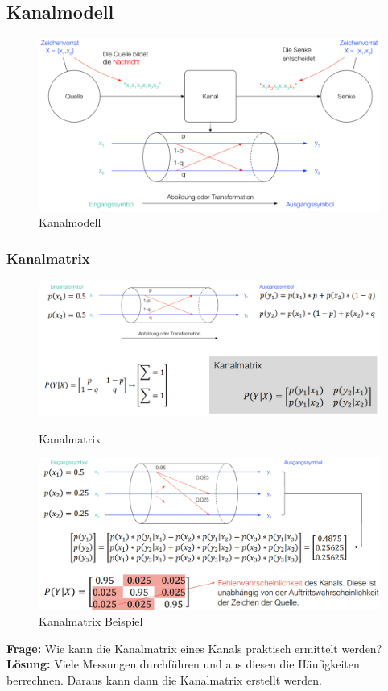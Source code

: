 \subsection{Kanalmodell}
\begin{figure}[h!]
	\centering
	\begin{minipage}[t]{0.9\textwidth}
		\centering
		\includegraphics[width=0.9\linewidth]{images/kanalmodell}
		\caption{Kanalmodell}
		\label{fig:kanalmodell}
	\end{minipage}
\end{figure}
\clearpage

\subsubsection{Kanalmatrix}
\begin{figure}[h!]
	\centering
	\begin{minipage}[t]{0.9\textwidth}
		\centering
		\includegraphics[width=0.9\linewidth]{images/kanalmatrix}
		\caption{Kanalmatrix}
		\label{fig:kanalmatrix}
	\end{minipage}
	\begin{minipage}[t]{0.9\textwidth}
		\centering
		\includegraphics[width=0.9\linewidth]{images/beispielkanalmatrix}
		\caption{Kanalmatrix Beispiel}
		\label{fig:kanalmatrixbeispiel}
	\end{minipage}
\end{figure}
\textbf{Frage:} Wie kann die Kanalmatrix eines Kanals praktisch ermittelt werden?\\
\textbf{Lösung:} Viele Messungen durchführen und aus diesen die Häufigkeiten berrechnen. Daraus kann dann die Kanalmatrix erstellt werden.
\clearpage

